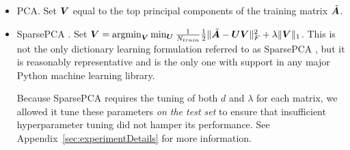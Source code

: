 \begin{itemize}\itemsep0em
    \item PCA. Set $\bm{V}$ equal to the top principal components of the training matrix $\tilde{\bm{A}}$.
    \item SparsePCA \cite{sparsePCA}. Set $\bm{V} = \operatorname*{argmin}_{\bm{V}} \min_{\bm{U}} \frac{1}{N_{train}} \frac{1}{2} \lVert \tilde{\bm{A}} - \bm{U}\bm{V} \rVert^2_F + \lambda \lVert\bm{V}\rVert_1$. This is not the only dictionary learning formulation referred to as SparsePCA \cite{spcaSurvey1,spcaSurvey2}, but it is reasonably representative and is the only one with support in any major Python machine learning library.%

    Because SparsePCA requires the tuning of both $d$ and $\lambda$ for each matrix, we allowed it tune these parameters \textit{on the test set} to ensure that insufficient hyperparameter tuning did not hamper its performance. See Appendix~\ref{sec:experimentDetails} for more information.


\end{itemize}
